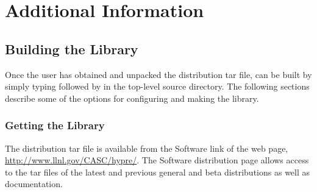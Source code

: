 
\chapter{Additional Information}


\section{Building the Library}

Once the user has obtained and unpacked the distribution tar file, \hypre{} can be built
by simply typing  followed by  in the top-level source directory.
The following sections describe some of the options for configuring and making the
\hypre{} library.


\subsection{Getting the Library}

The \hypre{} distribution tar file is available from the Software link of the
\hypre{} web page, \url{http://www.llnl.gov/CASC/hypre/}.  The \hypre{}
Software distribution page allows access to the tar files of the latest and
previous general and beta distributions as well as documentation.


